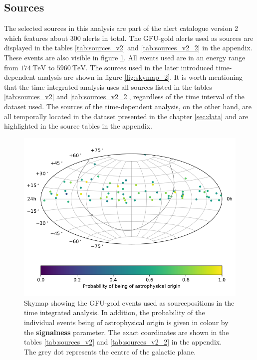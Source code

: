 \subsection{Sources}

The selected sources in this analysis are part of the alert catalogue version 2 which features about $\num{300}$ alerts in total.
The GFU-gold alerts used as sources are displayed in the tables \ref{tab:sources_v2} and \ref{tab:sources_v2_2} in the appendix.
These events are also visible in figure \ref{fig:skymap_1}.
All events used are in an energy range from $\SI{174}{\tera\electronvolt}$ to $\SI{5960}{\tera\electronvolt}$.
The sources used in the later introduced time-dependent analysis are shown in figure \ref{fig:skymap_2}.
It is worth mentioning that the time integrated analysis uses all sources listed in the tables \ref{tab:sources_v2} and \ref{tab:sources_v2_2}, regardless of the time interval of the dataset used.
The sources of the time-dependent analysis, on the other hand, are all temporally located in the dataset presented in the chapter \ref{sec:data} and are highlighted in the source tables in the appendix.

\begin{figure}
    \centering
    \includegraphics[draft=false,width=\linewidth]{Plots/02_sources/gfu_gold_skymap.png} %
    \caption{Skymap showing the GFU-gold events used as sourcepositions in the time integrated analysis. In addition, the probability of the individual events being of astrophysical origin is given in colour by the \textbf{signalness} parameter. The exact coordinates are shown in the tables \ref{tab:sources_v2} and \ref{tab:sources_v2_2} in the appendix. The grey dot represents the centre of the galactic plane.}
    \label{fig:skymap_1}
\end{figure}

